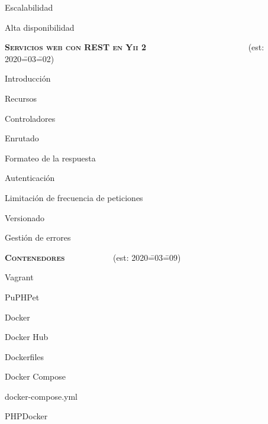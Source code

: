 \begin{longenum}
\begin{longenum}
\begin{longenum}
        \end{longenum}
        \item Escalabilidad \opcional\
        \item Alta disponibilidad \opcional\
    \end{longenum}
    \item \textbf{\textsc{Servicios web con REST en Yii 2}} \ \ \ \ \ \ \ \ \ \ \ \ \ \ \ \ \ \opcional\ \ \ \ \ \ \ (est: 2020\==03\==02)
    \begin{longenum}
        \item Introducción
        \item Recursos
        \item Controladores
        \item Enrutado
        \item Formateo de la respuesta
        \item Autenticación
        \item Limitación de frecuencia de peticiones
        \item Versionado
        \item Gestión de errores
    \end{longenum}
    \item \textbf{\textsc{Contenedores}} \ \ \ \ \ \ \ \ \opcional\ \ \ (est: 2020\==03\==09)
    \begin{longenum}
        \item Vagrant
        \begin{longenum}
            \item PuPHPet
        \end{longenum}
        \item Docker
        \begin{longenum}
            \item Docker Hub
            \item Dockerfiles
            \item Docker Compose
            \begin{longenum}
                \item docker-compose.yml
            \end{longenum}
        \end{longenum}
        \item PHPDocker
    \end{longenum}
\end{longenum}
